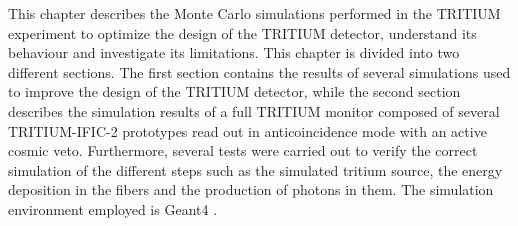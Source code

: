 This chapter describes the Monte Carlo simulations performed in the TRITIUM experiment to optimize the design of the TRITIUM detector, understand its behaviour and investigate its limitations. This chapter is divided into two different sections. The first section contains the results of several simulations used to improve the design of the TRITIUM detector, while the second section describes the simulation results of a full TRITIUM monitor composed of several TRITIUM-IFIC-2 prototypes read out in anticoincidence mode with an active cosmic veto. Furthermore, several tests were carried out to verify the correct simulation of the different steps such as the simulated tritium source, the energy deposition in the fibers and the production of photons in them. The simulation environment employed is Geant4 \cite{Geant4WebPage, Geant4P}.